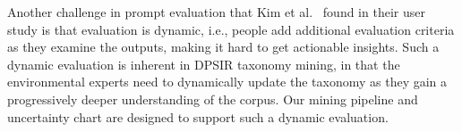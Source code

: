 Another challenge in prompt evaluation that Kim et al.~\cite{kim2024evallm} found in their user study is that evaluation is dynamic, i.e., people add additional evaluation criteria as they examine the outputs, making it hard to get actionable insights. Such a dynamic evaluation is inherent in DPSIR taxonomy mining, in that the environmental experts need to dynamically update the taxonomy as they gain a progressively deeper understanding of the corpus.
Our mining pipeline and uncertainty chart are designed to support such a dynamic evaluation.